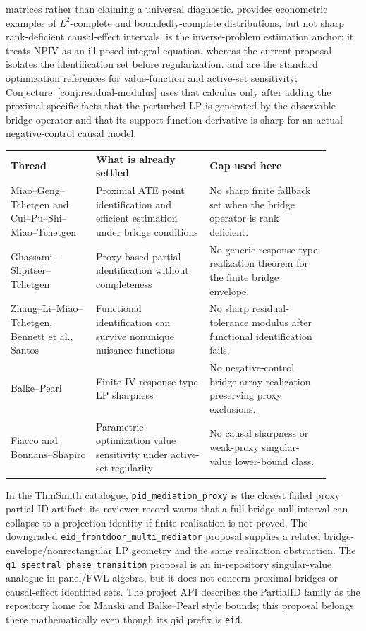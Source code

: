 \documentclass[11pt]{article}
\theoremstyle{definition}
\theoremstyle{plain}
\theoremstyle{remark}
\begin{document}
matrices rather than claiming a universal diagnostic.  \citet{Andrews2017JoECompleteness}
provides econometric examples of \(L^2\)-complete and boundedly-complete
distributions, but not sharp rank-deficient causal-effect intervals.
\citet{DarollesFanFlorensRenault2011Econometrica} is the inverse-problem
estimation anchor: it treats NPIV as an ill-posed integral equation, whereas
the current proposal isolates the identification set before regularization.
\citet{Fiacco1983Sensitivity} and \citet{BonnansShapiro2000Perturbation}
are the standard optimization references for value-function and active-set
sensitivity; Conjecture~\ref{conj:residual-modulus} uses that calculus only
after adding the proximal-specific facts that the perturbed LP is generated
by the observable bridge operator and that its support-function derivative is
sharp for an actual negative-control causal model.

\begin{center}
\begin{tabular}{p{0.24\linewidth}p{0.32\linewidth}p{0.34\linewidth}}
\textbf{Thread} & \textbf{What is already settled} & \textbf{Gap used here}\\
Miao--Geng--Tchetgen and Cui--Pu--Shi--Miao--Tchetgen &
Proximal ATE point identification and efficient estimation under bridge
conditions &
No sharp finite fallback set when the bridge operator is rank deficient.\\
Ghassami--Shpitser--Tchetgen &
Proxy-based partial identification without completeness &
No generic response-type realization theorem for the finite bridge envelope.\\
Zhang--Li--Miao--Tchetgen, Bennett et al., Santos &
Functional identification can survive nonunique nuisance functions &
No sharp residual-tolerance modulus after functional identification fails.\\
Balke--Pearl &
Finite IV response-type LP sharpness &
No negative-control bridge-array realization preserving proxy exclusions.
\\
Fiacco and Bonnans--Shapiro &
Parametric optimization value sensitivity under active-set regularity &
No causal sharpness or weak-proxy singular-value lower-bound class.
\end{tabular}
\end{center}

In the ThmSmith catalogue, \texttt{pid\_mediation\_proxy} is the closest
failed proxy partial-ID artifact: its reviewer record warns that a full
bridge-null interval can collapse to a projection identity if finite
realization is not proved.  The downgraded \texttt{eid\_frontdoor\_multi\_mediator}
proposal supplies a related bridge-envelope/nonrectangular LP geometry and
the same realization obstruction.  The \texttt{q1\_spectral\_phase\_transition}
proposal is an in-repository singular-value analogue in panel/FWL algebra,
but it does not concern proximal bridges or causal-effect identified sets.
The project API describes the PartialID family as the repository home for
Manski and Balke--Pearl style bounds; this proposal belongs there
mathematically even though its qid prefix is \texttt{eid}.
\end{document}
